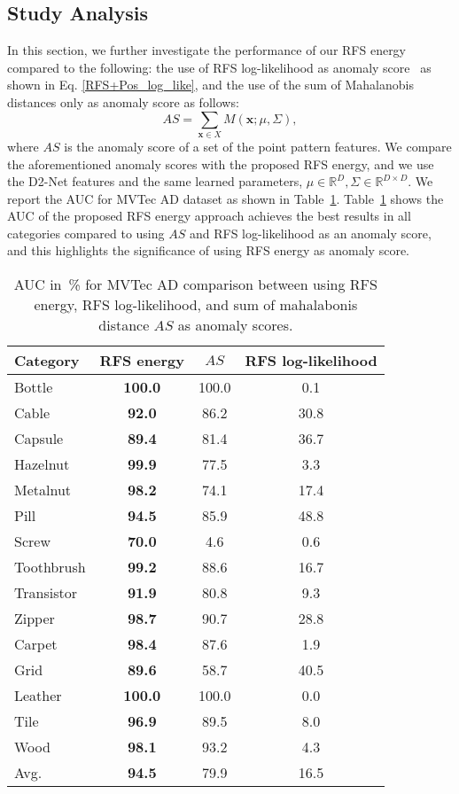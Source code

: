 \documentclass[journal]{IEEEtran}
\let\MYoriglatexcaption\caption
\renewcommand{\caption}[2][\relax]{\MYoriglatexcaption[#2]{#2}}
\begin{document}
\subsection{Study Analysis}
In this section, we further investigate the performance of our RFS energy compared to the following: the use of RFS log-likelihood as anomaly score~\cite{Vo2018} as shown in Eq. \eqref{RFS+Pos_log_like}, and the use of the sum of Mahalanobis distances only as anomaly score as follows:
\begin{equation}
    AS=\sum_{\mathbf{x}\in X} M(\mathbf{x};\mu,\Sigma),
\end{equation}
where $AS$ is the anomaly score of a set of the point pattern features. We compare the aforementioned anomaly scores with the proposed RFS energy, and we use the D2-Net features and the same learned parameters, $\mu \in \mathbb{R}^D,\Sigma \in \mathbb{R}^{D\times D}$. We report the AUC for MVTec AD dataset as shown in Table~\ref{Tab:Mal_Vs_rfs}. Table~\ref{Tab:Mal_Vs_rfs} shows the AUC of the proposed RFS energy approach achieves the best results in all categories compared to using $AS$ and RFS log-likelihood as an anomaly score, and this highlights the significance of using RFS energy as anomaly score.
\begin{table}[!h]
\centering
\caption{AUC in~\% for MVTec AD comparison between using RFS energy, RFS log-likelihood, and sum of mahalabonis distance $AS$ as anomaly scores.}
    \begin{tabular}{lccc}
    \toprule
    \textbf{Category} &RFS energy&$AS$&RFS log-likelihood \\
    \hline
    Bottle & \textbf{100.0} & 100.0 & 0.1 \\
    Cable & \textbf{92.0 } & 86.2  & 30.8 \\
    Capsule & \textbf{89.4}  & 81.4  & 36.7 \\
    Hazelnut & \textbf{99.9}  & 77.5  & 3.3 \\
    Metalnut & \textbf{98.2}  & 74.1  & 17.4 \\
    Pill  & \textbf{94.5}  & 85.9  & 48.8 \\
    Screw & \textbf{70.0 } & 4.6   & 0.6 \\
    Toothbrush & \textbf{99.2}  & 88.6  & 16.7 \\
    Transistor & \textbf{91.9}  & 80.8  & 9.3 \\
    Zipper & \textbf{98.7}  & 90.7  & 28.8 \\
     \hline
    Carpet & \textbf{98.4}  & 87.6  & 1.9 \\
    Grid  & \textbf{89.6}  & 58.7  & 40.5 \\
    Leather & \textbf{100.0} & 100.0 & 0.0 \\
    Tile  & \textbf{96.9}  & 89.5  & 8.0 \\
    Wood  & \textbf{98.1}  & 93.2  & 4.3 \\
    \hline
    Avg.  & \textbf{94.5}  & 79.9  & 16.5 \\
        \toprule
    \end{tabular}
    \label{Tab:Mal_Vs_rfs}
\end{table}
\end{document}
